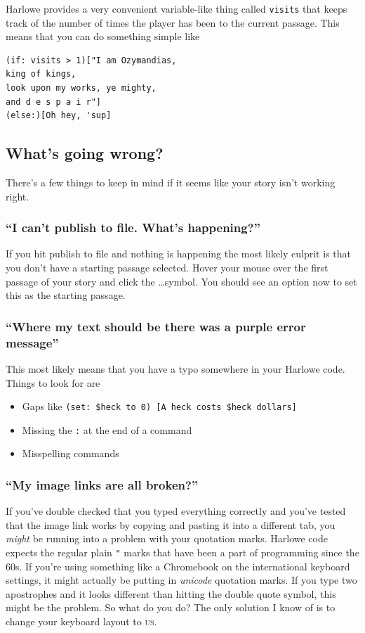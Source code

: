 \documentclass[a5paper,11pt]{article}
\begin{document}
Harlowe provides a very convenient variable-like thing called \verb"visits" that keeps track of the number of times the player has been to the current passage. This means that you can do something simple like

\begin{verbatim}
(if: visits > 1)["I am Ozymandias, 
king of kings,
look upon my works, ye mighty,
and d e s p a i r"]
(else:)[Oh hey, 'sup]
\end{verbatim}


\subsection{What's going wrong?}
There's a few things to keep in mind if it seems like your story isn't working right.
\subsubsection{``I can't publish to file. What's happening?''}
If you hit publish to file and nothing is happening the most likely culprit is that you don't have a starting passage selected. Hover your mouse over the first passage of your story and click the \ldots symbol. You should see an option now to set this as the starting passage. 
\subsubsection{``Where my text should be there was a purple error message''}
This most likely means that you have a typo somewhere in your Harlowe code. Things to look for are
\begin{itemize}
 \item Gaps like \verb"(set: $heck to 0) [A heck costs $heck dollars]"
 \item Missing the \verb":" at the end of a command
 \item Misspelling commands
\end{itemize}
\subsubsection{``My image links are all broken?''}
If you've double checked that you typed everything correctly and you've tested that the image link works by copying and pasting it into a different tab, you \emph{might} be running into a problem with your quotation marks. Harlowe code expects the regular plain \verb|"| marks that have been a part of programming since the 60s. If you're using something like a Chromebook on the international keyboard settings, it might actually be putting in \emph{unicode} quotation marks. If you type two apostrophes and it looks different than hitting the double quote symbol, this might be the problem. So what do you do? The only solution I know of is to change your keyboard layout to \textsc{us}. 
\end{document}
